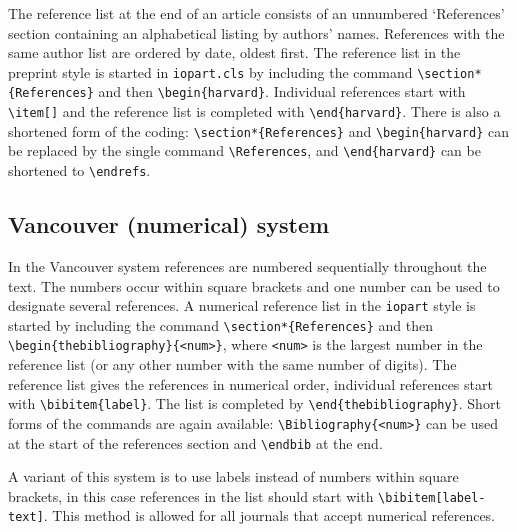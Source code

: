 \documentclass[12pt]{iopart}
\begin{document}
The reference list at the end of an article consists of an 
unnumbered `References' section containing an
alphabetical listing by authors' names. References with the same author list are ordered by date, oldest first.
The reference list in the 
preprint style is started in \verb"iopart.cls" by including the command \verb"\section*{References}" and then
\verb"\begin{harvard}".
Individual references start with \verb"\item[]" and the reference list is completed with \verb"\end{harvard}".
There is also a shortened form of the coding: \verb"\section*{References}"
and \verb"\begin{harvard}" can be replaced by the single command
\verb"\References", and \verb"\end{harvard}" can be shortened to
\verb"\endrefs".

\subsection{Vancouver (numerical) system}
In the Vancouver system references are numbered sequentially 
throughout the text. The numbers occur within square brackets and one 
number can be used to designate several references. A numerical 
reference list in the \verb"iopart" style is started by including the 
command \verb"\section*{References}" and then
\verb"\begin{thebibliography}{<num>}", where \verb"<num>" is the largest
number in the reference list (or any other number with the same number
of digits).  The 
reference list gives the references in 
numerical order, individual references start with \verb"\bibitem{label}". The list is completed by
\verb"\end{thebibliography}". Short forms of the commands are again
available: \verb"\Bibliography{<num>}" can be used at the start of the
references section and \verb"\endbib" at the end.

A variant of this system is to use labels instead of numbers within 
square brackets, in this case references in the list should start with \verb"\bibitem[label-text]". This method is allowed for all journals that accept numerical references.
\end{document}
